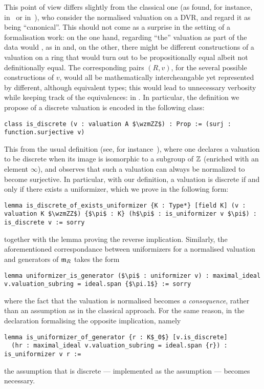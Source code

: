 \documentclass[sigplan,10pt,anonymous,review]{acmart}
\begin{document}
This point of view differs slightly from the classical one (as found, for instance, in~\cite[Chapitre~I]{Ser62} or in~\cite[???]{Bou85}), who  consider the normalised valuation on a DVR, and regard it as being ``canonical''. This should not come as a surprise in the setting of a formalisation work: on the one hand, regarding ``the'' valuation as part of the data would , as in  and, on the other, there might be different constructions of a valuation on a ring that would turn out to be propositionally equal albeit not definitionally equal. The corresponding pairs $(R,v)$, for the several possible constructions of $v$, would all be mathematically intercheangable yet represented by different, although equivalent types; this would lead to unnecessary verbosity while keeping track of the equivalences: in . In particular, the definition we propose of a discrete valuation is encoded in the following class:
\begin{lstlisting}
class is_discrete (v : valuation A $\wzmZZ$) : Prop := (surj : function.surjective v)
\end{lstlisting}
This  from the usual definition (see, for instance~\cite[Proposition~I.1]{Ser62}), where one declares a valuation to be discrete when its image is isomorphic to a subgroup of $\mathbb{Z}$ (enriched with an element $\infty$), and observes that such a valuation can always be normalized to become surjective. In particular, with our definition, a valuation is discrete if and only if there exists a uniformizer, which we prove in the following form:
\begin{lstlisting}
lemma is_discrete_of_exists_uniformizer {K : Type*} [field K] (v : valuation K $\wzmZZ$) {$\pi$ : K} (h$\pi$ : is_uniformizer v $\pi$) : is_discrete v := sorry
\end{lstlisting}
together with the lemma  proving the reverse implication. Similarly, the aforementioned correspondance between uniformizers for a normalised valuation and generators of $\mathfrak{m}_{R}$ takes the form
\begin{lstlisting}
lemma uniformizer_is_generator ($\pi$ : uniformizer v) : maximal_ideal v.valuation_subring = ideal.span {$\pi.1$} := sorry
\end{lstlisting}
where the fact that the valuation is normalised becomes \emph{a consequence}, rather than an assumption as in the classical approach. For the same reason, in the declaration formalising the opposite implication, namely
\begin{lstlisting}
lemma is_uniformizer_of_generator {r : K$_0$} [v.is_discrete]
  (hr : maximal_ideal v.valuation_subring = ideal.span {r}) : is_uniformizer v r :=
\end{lstlisting}
the assumption that  is discrete --- implemented as the  assumption \code{[v.is_discrete]} --- becomes necessary.
\end{document}
